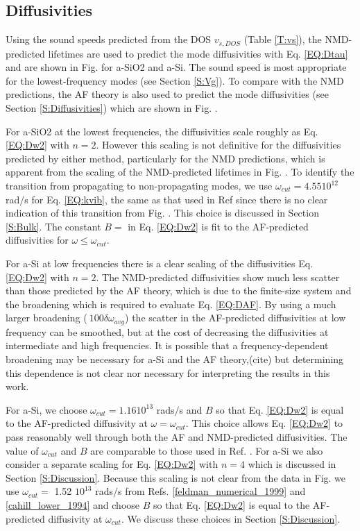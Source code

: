 \documentclass[aps,prb,onecolumn,preprint,superscriptaddress,footinbib,amsmath,amssymb,floatfix]{revtex4}
\begin{document}
\subsection{\label{S:Diffusivities}Diffusivities}

Using the sound speeds predicted 
from the DOS $v_{s,DOS}$ (Table \ref{T:vs}), the NMD-predicted lifetimes 
are used to predict the mode diffusivities with Eq. \eqref{EQ:Dtau} 
and are shown in Fig. for a-SiO2 and a-Si. 
The sound speed is most appropriate  
for the lowest-frequency modes (see Section \ref{S:Vg}). To compare with 
the NMD predictions, the AF theory is also used to predict the mode 
diffusivities (see Section \ref{S:Diffusivities}) which are shown 
in Fig. . 

For a-SiO2 at the lowest frequencies, the 
diffusivities scale roughly as Eq. \eqref{EQ:Dw2} with $n=2$.  
However this 
scaling is not definitive for the diffusivities predicted by either 
method, particularly for the NMD predictions, which 
is apparent from the scaling of the NMD-predicted lifetimes 
in Fig. . To identify the transition from propagating 
to non-propagating modes, we use $\omega_{cut} = 4.55 10^{12}$ rad$/$s 
for Eq. \eqref{EQ:kvib}, 
the same as that used in Ref  since 
there is no clear indication of this transition from Fig. . 
This choice is discussed in Section \ref{S:Bulk}. The constant 
$B=$ in Eq. \eqref{EQ:Dw2} 
is fit to the AF-predicted diffusivities for 
$\omega \le \omega_{cut}$.

For a-Si at low frequencies there is a clear scaling of the 
diffusivities Eq. \eqref{EQ:Dw2} with $n=2$.  
The NMD-predicted diffusivities show much less 
scatter than those predicted by the AF theory, which is due to 
the finite-size system and the broadening which is required to evaluate 
Eq. \eqref{EQ:DAF}.\cite{feldman_thermal_1993} By using a much larger 
broadening ($~100\delta\omega_{avg}$) the scatter in the AF-predicted 
diffusivities at low frequency can be smoothed, but at the cost of 
decreasing the diffusivities at intermediate and high frequencies. 
It is possible that a frequency-dependent broadening may be necessary 
for a-Si and the AF theory,(cite)  
but determining this dependence is not clear nor necessary for 
interpreting the results in this work.  

For a-Si, we choose $\omega_{cut}=1.16 10^13$ rads$/$s 
and $B$ so that Eq. \eqref{EQ:Dw2} is equal 
to the AF-predicted diffusivity at $\omega=\omega_{cut}$. This choice 
allows Eq. \eqref{EQ:Dw2} to pass reasonably well through both the AF and NMD-predicted 
diffusivities.  The value of $\omega_{cut}$ and $B$ are comparable to 
those used in Ref. .  For a-Si we also consider a separate scaling 
for Eq. \eqref{EQ:Dw2} with $n=4$ which is discussed in Section \ref{S:Discussion}. 
Because this scaling is not clear from the data in Fig. we use 
$\omega_{cut} = $ 1.52 $10^13$ rads$/$s  
from Refs. \ref{feldman_numerical_1999} and \ref{cahill_lower_1994} 
and choose $B$ so that Eq. \eqref{EQ:Dw2} is equal to the AF-predicted 
diffusivity at $\omega_{cut}$. We discuss these choices in 
Section \ref{S:Discussion}. 
\end{document}
